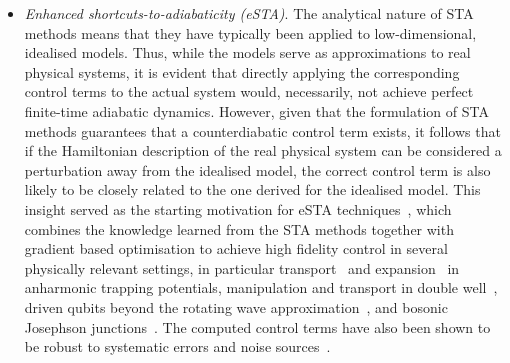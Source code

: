 \begin{itemize}
\item {\it Enhanced shortcuts-to-adiabaticity (eSTA)}. The analytical nature of STA methods means that they have typically been applied to low-dimensional, idealised models. Thus, while the models serve as approximations to real physical systems, it is evident that directly applying the corresponding control terms to the actual system would, necessarily, not achieve perfect finite-time adiabatic dynamics. However, given that the formulation of STA methods guarantees that a counterdiabatic control term exists, it follows that if the Hamiltonian description of the real physical system can be considered a perturbation away from the idealised model, the correct control term is also likely to be closely related to the one derived for the idealised model. This insight served as the starting motivation for eSTA techniques~\cite{eSTA1, eSTA2}, which combines the knowledge learned from the STA methods together with gradient based optimisation to achieve high fidelity control in several physically relevant settings, in particular transport~\cite{eSTA1, eSTA2, eSTA6} and expansion~\cite{eSTA3} in anharmonic trapping potentials, manipulation and transport in double well~\cite{eSTA7}, driven qubits beyond the rotating wave approximation~\cite{eSTA1}, and bosonic Josephson junctions~\cite{eSTA5}. The computed control terms have also been shown to be robust to systematic errors and noise sources~\cite{eSTA2, eSTA5}. 


\end{itemize}
